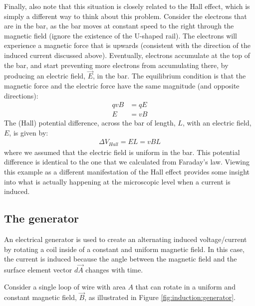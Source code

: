 Finally, also note that this situation is closely related to the Hall effect, which is simply a different way to think about this problem. Consider the electrons that are in the bar, as the bar moves at constant speed to the right through the magnetic field (ignore the existence of the U-shaped rail). The electrons will experience a magnetic force that is upwards (consistent with the direction of the induced current discussed above). Eventually, electrons accumulate at the top of the bar, and start preventing more electrons from accumulating there, by producing an electric field, $\vec E$, in the bar. The equilibrium condition is that the magnetic force and the electric force have the same magnitude (and opposite directions):
\begin{align*}
qvB &= qE\\
E &= vB
\end{align*}
The (Hall) potential difference, across the bar of length, $L$, with an electric field, $E$, is given by:
\begin{align*}
\Delta V_{Hall} = EL = vBL
\end{align*}
where we assumed that the electric field is uniform in the bar. This potential difference is identical to the one that we calculated from Faraday's law. Viewing this example as a different manifestation of the Hall effect provides some insight into what is actually happening at the microscopic level when a current is induced. 


\subsection{The generator}
An electrical generator is used to create an alternating induced voltage/current by rotating a coil inside of a constant and uniform magnetic field. In this case, the current is induced because the angle between the magnetic field and the surface element vector $d\vec A$ changes with time.

Consider a single loop of wire with area $A$ that can rotate in a uniform and constant magnetic field, $\vec B$, as illustrated in Figure \ref{fig:induction:generator}. 

